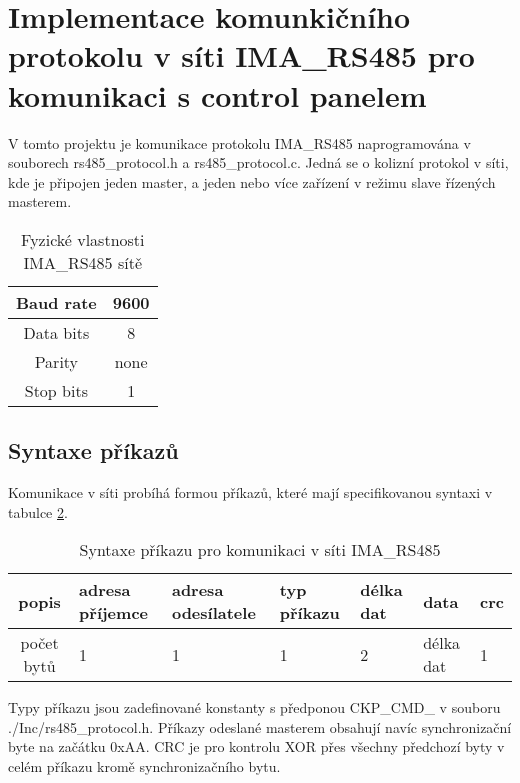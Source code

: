\section{Implementace komunkičního protokolu v síti IMA\_RS485 pro komunikaci s control panelem}
V tomto projektu je komunikace protokolu IMA\_RS485 naprogramována v souborech rs485\_protocol.h a rs485\_protocol.c. 
Jedná se o kolizní protokol v síti, kde je připojen jeden master, a jeden nebo více zařízení v režimu slave řízených masterem.

\begin{table}[!h]
    \centering
    \begin{tabular}{ |c|c| }
     \hline

     Baud rate              & 9600           \\ \hline
     Data bits              & 8                 \\ \hline
     Parity                 & none              \\ \hline
     Stop bits              & 1                 \\ \hline

    \end{tabular}
    \caption{Fyzické vlastnosti IMA\_RS485 sítě}
    \label{table:3}
\end{table}

\newpage
\subsection{Syntaxe příkazů}
Komunikace v síti probíhá formou příkazů, které mají specifikovanou syntaxi v tabulce \ref{table:syntaxePrikazu}.

\begin{table}[!h]
    \centering
\begin{tabular}{ |c|| p{1.5cm} | p{1.5cm} | p{1cm} | p{1cm} | p{1cm} | p{1cm} | }
 \hline
 popis      & adresa příjemce & adresa odesílatele & typ příkazu & délka dat & data & crc\\ \hline
 počet bytů & 1               & 1   & 1     & 2     & délka dat     & 1 \\ 
 \hline
\end{tabular}
    \caption{Syntaxe příkazu pro komunikaci v síti IMA\_RS485}
    \label{table:syntaxePrikazu}
\end{table}

Typy příkazu jsou zadefinované konstanty s předponou CKP\_CMD\_ v souboru ./Inc/rs485\_protocol.h.
Příkazy odeslané masterem obsahují navíc synchronizační byte na začátku 0xAA.
CRC je pro kontrolu XOR přes všechny předchozí byty v celém příkazu kromě synchronizačního bytu.

